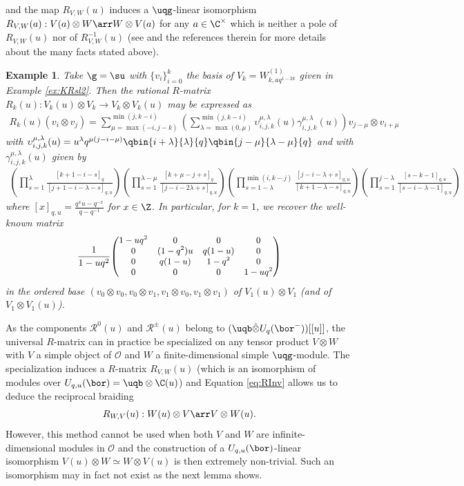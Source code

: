 \documentclass[11pt]{amsart}
\newtheorem{example}[theorem]{Example}
\theoremstyle{definition}
\theoremstyle{remark}
\numberwithin{equation}{section}
\begin{document}
and the map $R_{V,W}(u)$ induces a $\uqg$-linear isomorphism $R_{V,W}(a) : V(a)\otimes W\arr W\otimes V(a) $ for any $a\in \C^{\times}$ which is neither a pole of $R_{V,W}(u)$ nor of $R_{V,W}^{-1}(u)$ (see \cite{her} and the references therein for more details about the many facts stated above).  
\begin{example}\label{ex:RmatKR} Take $\g = \su$ with $\{v_i\}_{i=0}^k$ the basis of $V_k = W_{k,a q^{1-2k}}^{(1)}$ given in Example \ref{ex:KRsl2}. Then the rational $R$-matrix $R_{k}(u):V_k(u)\otimes V_k \rightarrow V_k\otimes V_k(u)$ may be expressed as
\begin{align*}
R_{k}(u)(v_i\otimes v_j) = \sum_{\mu = \max(-i,j-k)}^{\min(j,k-i)}\left(\sum_{\lambda = \max(0,\mu)}^{\min(j,k-i)} \upsilon_{i,j,k}^{\mu,\lambda}(u)\gamma_{i,j,k}^{\mu,\lambda}(u) \right)v_{j-\mu}\otimes v_{i+\mu}
\end{align*}
with $\upsilon_{i,j,k}^{\mu,\lambda}(u)=u^{\lambda}q^{\mu(j-i-\mu)}\qbin{i+\lambda}{\lambda}{q}\qbin{j-\mu}{\lambda-\mu}{q}$ and with $\gamma_{i,j,k}^{\mu,\lambda}(u)$ given by
\begin{align*}
\textstyle \left(\prod_{s=1}^{\lambda} \frac{[k+1-i-s]_q}{[j+1-i-\lambda-s]_{q,u}}\right)\left(\prod_{s=1}^{\lambda-\mu} \frac{[k+\mu-j+s]_q}{[j-i-2\lambda+s]_{q,u}}\right)\left(\prod_{s=1-\lambda}^{\min(i,k-j)} \frac{[j-i-\lambda+s]_{q,u}}{[k+1-\lambda-s]_{q,u}}\right)\left(\prod_{s=1}^{j-\lambda} \frac{[s-k-1]_{q,u}}{[s-i-\lambda-1]_{q,u}}\right)
\end{align*}
where $[x]_{q,u} = \frac{q^x u - q^{-x}}{q-q^{-1}}$ for $x \in \Z$. In particular, for $k=1$, we recover the well-known matrix
\begin{align*}
\frac{1}{1-uq^2}{\small \begin{pmatrix}
1-uq^2 & 0 & 0 & 0\\
0 & (1-q^2)u & q(1-u) & 0 \\
0 & q(1-u)& 1-q^2 & 0 \\
0 & 0 & 0 & 1-uq^2
\end{pmatrix} }
\end{align*}
in the ordered base $(v_0\otimes v_0, v_0\otimes v_1, v_1\otimes v_0, v_1\otimes v_1)$ of $V_1(u)\otimes V_1$ (and of $V_1\otimes V_1(u)$).
\end{example}
As the components $\mathcal{R}^0(u)$ and $\mathcal{R}^{\pm}(u)$ belong to $(\uqb \hat{\otimes} U_q(\bor^-))[[u]]$, the universal $R$-matrix can in practice be specialized on any tensor product $V\otimes W$ with $V$ a simple object of $\mathcal{O}$ and $W$ a finite-dimensional simple $\uqg$-module. The specialization induces a $R$-matrix $R_{V,W}(u)$ (which is an isomorphism of modules over $U_{q,u}(\bor)=\uqb\otimes \C(u)$) and Equation \eqref{eq:RInv} allows us to deduce the reciprocal braiding $$ R_{W,V}(u):W(u)\otimes V\arr V\otimes W(u).$$ However, this method cannot be used when both $V$ and $W$ are infinite-dimensional modules in $\mathcal{O}$ and the construction of a $U_{q,u}(\bor)$-linear isomorphism $V(u)\otimes W\simeq W\otimes V(u)$ is then extremely non-trivial. Such an isomorphism may in fact not exist as the next lemma shows. 
\end{document}
